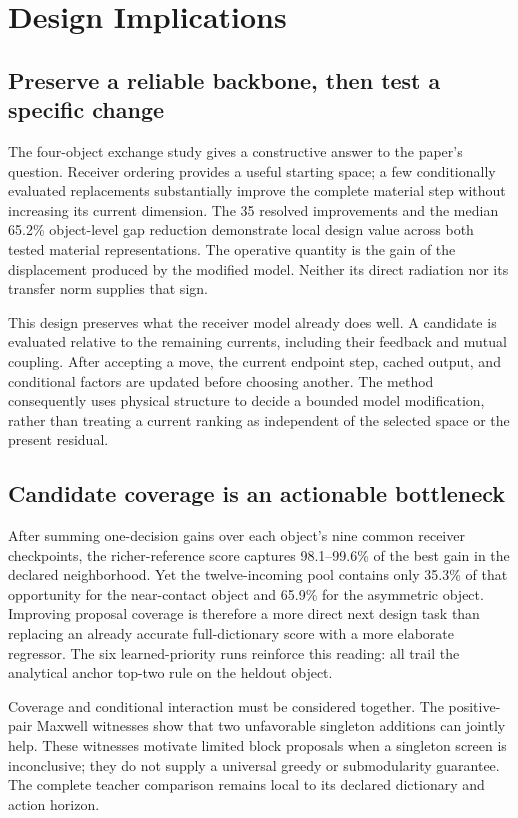 \section{Design Implications}
\subsection{Preserve a reliable backbone, then test a specific change}
The four-object exchange study gives a constructive answer to the paper's question. Receiver ordering provides a useful starting space; a few conditionally evaluated replacements substantially improve the complete material step without increasing its current dimension. The 35 resolved improvements and the median 65.2\% object-level gap reduction demonstrate local design value across both tested material representations. The operative quantity is the gain of the displacement produced by the modified model. Neither its direct radiation nor its transfer norm supplies that sign.

This design preserves what the receiver model already does well. A candidate is evaluated relative to the remaining currents, including their feedback and mutual coupling. After accepting a move, the current endpoint step, cached output, and conditional factors are updated before choosing another. The method consequently uses physical structure to decide a bounded model modification, rather than treating a current ranking as independent of the selected space or the present residual.

\subsection{Candidate coverage is an actionable bottleneck}
After summing one-decision gains over each object's nine common receiver checkpoints, the richer-reference score captures 98.1--99.6\% of the best gain in the declared neighborhood. Yet the twelve-incoming pool contains only 35.3\% of that opportunity for the near-contact object and 65.9\% for the asymmetric object. Improving proposal coverage is therefore a more direct next design task than replacing an already accurate full-dictionary score with a more elaborate regressor. The six learned-priority runs reinforce this reading: all trail the analytical anchor top-two rule on the heldout object.

Coverage and conditional interaction must be considered together. The positive-pair Maxwell witnesses show that two unfavorable singleton additions can jointly help. These witnesses motivate limited block proposals when a singleton screen is inconclusive; they do not supply a universal greedy or submodularity guarantee. The complete teacher comparison remains local to its declared dictionary and action horizon.

